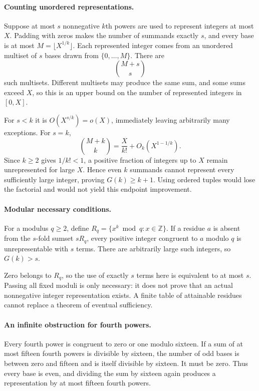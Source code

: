 \documentclass[11pt]{article}
\begin{document}
\paragraph{Counting unordered representations.}
Suppose at most $s$ nonnegative $k$th powers are used to represent integers at most $X$. Padding with zeros makes the number of summands exactly $s$, and every base is at most $M=\lfloor X^{1/k}\rfloor$. Each represented integer comes from an unordered multiset of $s$ bases drawn from $\{0,\ldots,M\}$. There are
\[
\binom{M+s}{s}
\]
such multisets. Different multisets may produce the same sum, and some sums exceed $X$, so this is an upper bound on the number of represented integers in $[0,X]$.

For $s<k$ it is $O(X^{s/k})=o(X)$, immediately leaving arbitrarily many exceptions. For $s=k$,
\[
\binom{M+k}{k}=\frac{X}{k!}+O_k(X^{1-1/k}).
\]
Since $k\ge2$ gives $1/k!<1$, a positive fraction of integers up to $X$ remain unrepresented for large $X$. Hence even $k$ summands cannot represent every sufficiently large integer, proving $G(k)\ge k+1$. Using ordered tuples would lose the factorial and would not yield this endpoint improvement.

\paragraph{Modular necessary conditions.}
For a modulus $q\ge2$, define $R_q=\{x^k\bmod q:x\in\mathbb Z\}$. If a residue $a$ is absent from the $s$-fold sumset $sR_q$, every positive integer congruent to $a$ modulo $q$ is unrepresentable with $s$ terms. There are arbitrarily large such integers, so $G(k)>s$.

Zero belongs to $R_q$, so the use of exactly $s$ terms here is equivalent to at most $s$. Passing all fixed moduli is only necessary: it does not prove that an actual nonnegative integer representation exists. A finite table of attainable residues cannot replace a theorem of eventual sufficiency.

\paragraph{An infinite obstruction for fourth powers.}
Every fourth power is congruent to zero or one modulo sixteen. If a sum of at most fifteen fourth powers is divisible by sixteen, the number of odd bases is between zero and fifteen and is itself divisible by sixteen. It must be zero. Thus every base is even, and dividing the sum by sixteen again produces a representation by at most fifteen fourth powers.
\end{document}
